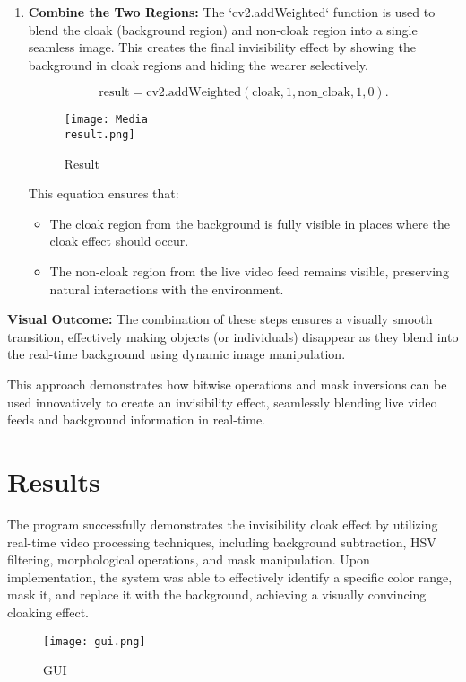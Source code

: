 \documentclass[onecolumn]{article} %
\begin{document}
\begin{enumerate}
    \item \textbf{Combine the Two Regions:}  
    The `cv2.addWeighted` function is used to blend the cloak (background region) and non-cloak region into a single seamless image. This creates the final invisibility effect by showing the background in cloak regions and hiding the wearer selectively.

    \[
    \text{result} = \text{cv2.addWeighted}(\text{cloak}, 1, \text{non\_cloak}, 1, 0).
    \]

\begin{figure}[h!]
    \centering
    \texttt{[image: Media\\result.png]}
    \caption{Result}
    \label{fig:Final Result}
\end{figure}

    This equation ensures that:
    \begin{itemize}
        \item The cloak region from the background is fully visible in places where the cloak effect should occur.
        \item The non-cloak region from the live video feed remains visible, preserving natural interactions with the environment.
    \end{itemize}
\end{enumerate}

\textbf{Visual Outcome:}  
The combination of these steps ensures a visually smooth transition, effectively making objects (or individuals) disappear as they blend into the real-time background using dynamic image manipulation.

This approach demonstrates how bitwise operations and mask inversions can be used innovatively to create an invisibility effect, seamlessly blending live video feeds and background information in real-time.


\section{Results}

The program successfully demonstrates the invisibility cloak effect by utilizing real-time video processing techniques, including background subtraction, HSV filtering, morphological operations, and mask manipulation. Upon implementation, the system was able to effectively identify a specific color range, mask it, and replace it with the background, achieving a visually convincing cloaking effect.

\begin{figure}[h!]
    \centering
    \texttt{[image: gui.png]}
    \caption{GUI}
    \label{fig:Graphical User Interface of the program}
\end{figure}
\end{document}
